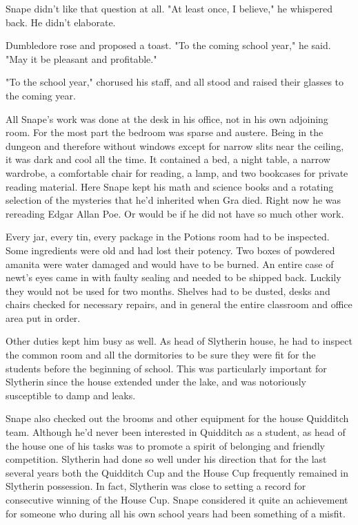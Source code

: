 \documentclass[a4paper,11pt]{article}
\begin{document}
Snape didn't like that question at all. "At least once, I believe," he whispered back. He didn't elaborate.

Dumbledore rose and proposed a toast. "To the coming school year," he said. "May it be pleasant and profitable."

"To the school year," chorused his staff, and all stood and raised their glasses to the coming year.

All Snape's work was done at the desk in his office, not in his own adjoining room. For the most part the bedroom was sparse and austere. Being in the dungeon and therefore without windows except for narrow slits near the ceiling, it was dark and cool all the time. It contained a bed, a night table, a narrow wardrobe, a comfortable chair for reading, a lamp, and two bookcases for private reading material. Here Snape kept his math and science books and a rotating selection of the mysteries that he'd inherited when Gra died. Right now he was rereading Edgar Allan Poe. Or would be if he did not have so much other work.

Every jar, every tin, every package in the Potions room had to be inspected. Some ingredients were old and had lost their potency. Two boxes of powdered amanita were water damaged and would have to be burned. An entire case of newt's eyes came in with faulty sealing and needed to be shipped back. Luckily they would not be used for two months. Shelves had to be dusted, desks and chairs checked for necessary repairs, and in general the entire classroom and office area put in order.

Other duties kept him busy as well. As head of Slytherin house, he had to inspect the common room and all the dormitories to be sure they were fit for the students before the beginning of school. This was particularly important for Slytherin since the house extended under the lake, and was notoriously susceptible to damp and leaks.

Snape also checked out the brooms and other equipment for the house Quidditch team. Although he'd never been interested in Quidditch as a student, as head of the house one of his tasks was to promote a spirit of belonging and friendly competition. Slytherin had done so well under his direction that for the last several years both the Quidditch Cup and the House Cup frequently remained in Slytherin possession. In fact, Slytherin was close to setting a record for consecutive winning of the House Cup. Snape considered it quite an achievement for someone who during all his own school years had been something of a misfit.
\end{document}
